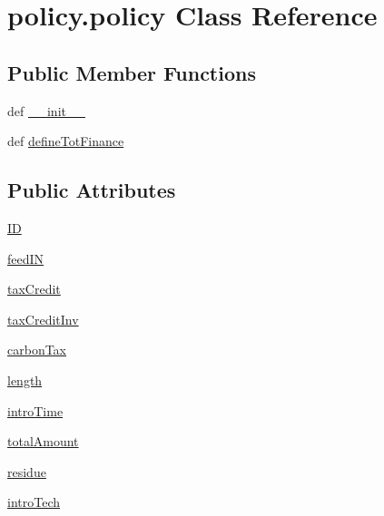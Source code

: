 \hypertarget{classpolicy_1_1policy}{\section{policy.\-policy Class Reference}
\label{classpolicy_1_1policy}
}
\subsection*{Public Member Functions}
\begin{DoxyCompactItemize}
\item 
def \hyperlink{classpolicy_1_1policy_a53bd90d3e68e3d5501881818ffab2239}{\-\_\-\-\_\-init\-\_\-\-\_\-}
\item 
def \hyperlink{classpolicy_1_1policy_ab6b7a26d59555d82883412336af73c2d}{define\-Tot\-Finance}
\end{DoxyCompactItemize}
\subsection*{Public Attributes}
\begin{DoxyCompactItemize}
\item 
\hyperlink{classpolicy_1_1policy_a9db0590c5c9ede972a38a4a5be0be707}{I\-D}
\item 
\hyperlink{classpolicy_1_1policy_ad7ccbdc8d842ac638045db7389eadf94}{feed\-I\-N}
\item 
\hyperlink{classpolicy_1_1policy_a9f59d3ac957bef82d164303b9af656d1}{tax\-Credit}
\item 
\hyperlink{classpolicy_1_1policy_a90637806ccf81726d7f5084b0b63e44e}{tax\-Credit\-Inv}
\item 
\hyperlink{classpolicy_1_1policy_ab5274974d3f8e6b19c6c5a23f04f9b69}{carbon\-Tax}
\item 
\hyperlink{classpolicy_1_1policy_af00e78989c7d2828e7b4229e39843ca0}{length}
\item 
\hyperlink{classpolicy_1_1policy_a7f55cb2613c6314c33db2e968696a571}{intro\-Time}
\item 
\hyperlink{classpolicy_1_1policy_ae7122c03e70428c903fd13f713b0b2a9}{total\-Amount}
\item 
\hyperlink{classpolicy_1_1policy_ab78d71bff388654cfacb959bfe5cef03}{residue}
\item 
\hyperlink{classpolicy_1_1policy_af6b257b9fdd301fd9b64b356f30225de}{intro\-Tech}
\end{DoxyCompactItemize}


